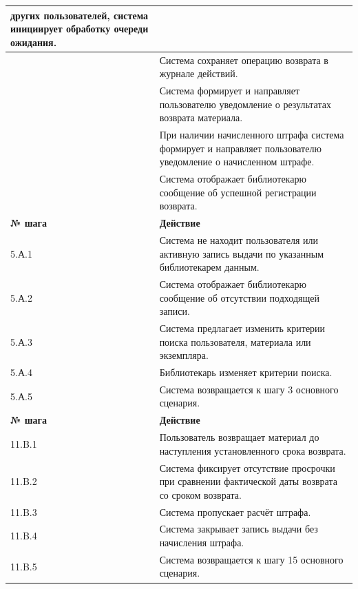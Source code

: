 \documentclass[12pt,a4paper]{article}
\begin{document}
\begin{xltabular}{\textwidth}{
				|>{\raggedright\arraybackslash}p{2.7cm}
				|>{\raggedright\arraybackslash}X|
			}
			других пользователей, система инициирует обработку очереди ожидания. \\
			 & Система сохраняет операцию возврата в журнале действий. \\
			 & Система формирует и направляет пользователю уведомление о
			результатах возврата материала. \\
			 & При наличии начисленного штрафа система формирует и направляет
			пользователю уведомление о начисленном штрафе. \\
			 & Система отображает библиотекарю сообщение об успешной регистрации
			возврата. \\
			\hline
			
			
			\textbf{№ шага} & \textbf{Действие} \\
			\hline
			
			5.А.1 & Система не находит пользователя или активную запись выдачи по
			указанным библиотекарем данным. \\
			\hline
			5.А.2 & Система отображает библиотекарю сообщение об отсутствии подходящей
			записи. \\
			\hline
			5.А.3 & Система предлагает изменить критерии поиска пользователя,
			материала или экземпляра. \\
			\hline
			5.А.4 & Библиотекарь изменяет критерии поиска. \\
			\hline
			5.А.5 & Система возвращается к шагу 3 основного сценария. \\
			\hline
			
			
			\textbf{№ шага} & \textbf{Действие} \\
			\hline
			
			11.B.1 & Пользователь возвращает материал до наступления установленного срока
			возврата. \\
			\hline
			11.B.2 & Система фиксирует отсутствие просрочки при сравнении фактической
			даты возврата со сроком возврата. \\
			\hline
			11.B.3 & Система пропускает расчёт штрафа. \\
			\hline
			11.B.4 & Система закрывает запись выдачи без начисления штрафа. \\
			\hline
			11.B.5 & Система возвращается к шагу 15 основного сценария. \\
			\hline
			

\end{xltabular}
\end{document}
